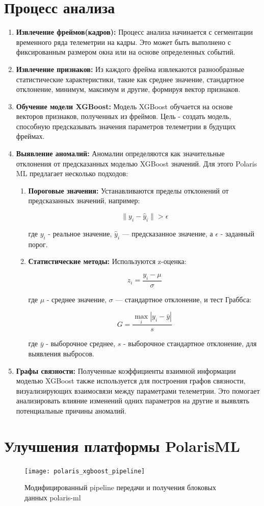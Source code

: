 \section{Процесс анализа}

\begin{enumerate}[label=\arabic*.]
	\item \textbf{Извлечение фреймов(кадров):} Процесс анализа начинается с сегментации
	      временного ряда телеметрии на кадры.
	      Это может быть выполнено с фиксированным размером окна или на основе
	      определенных событий.
	\item \textbf{Извлечение признаков:} Из каждого фрейма извлекаются
	      разнообразные статистические характеристики, такие как среднее значение,
	      стандартное отклонение, минимум, максимум и другие, формируя вектор
	      признаков.
	\item \textbf{Обучение модели XGBoost:} Модель XGBoost обучается на основе
	      векторов признаков, полученных из фреймов.
	      Цель - создать модель, способную предсказывать значения параметров
	      телеметрии в будущих фреймах.
	\item \textbf{Выявление аномалий:} Аномалии определяются как значительные
	      отклонения от предсказанных моделью XGBoost значений.
	      Для этого Polaris ML предлагает несколько подходов:
	      \begin{enumerate}[label=\alph*.]
		      \item \textbf{Пороговые значения:} Устанавливаются пределы отклонений от предсказанных значений, например:

		            \[\| y_i - \hat{y}_i \| > \epsilon\]

		            где $y_i$ - реальное значение, $\hat{y}_i$ — предсказанное значение, а $\epsilon$ - заданный порог.
		      \item \textbf{Статистические методы:} Используются z-оценка:

		            \[z_i = \frac{y_i - \mu}{\sigma}\]

		            где $\mu$ - среднее значение, $\sigma$ — стандартное отклонение, и тест Граббса:

		            \[G = \frac{\max_{i}|y_i - \bar{y}|}{s}\]

		            где $\bar{y}$ - выборочное среднее, $s$ - выборочное стандартное отклонение, для выявления выбросов.
	      \end{enumerate}
	\item \textbf{Графы связности:} Полученные коэффициенты взаимной информации моделью XGBoost также используется для
	      построения графов связности, визуализирующих взаимосвязи между параметрами
	      телеметрии.
	      Это помогает анализировать влияние изменений одних параметров на другие
	      и выявлять потенциальные причины аномалий.
\end{enumerate}


\section{Улучшения платформы PolarisML}

\begin{figure}[!htbp]
	\centering
	\texttt{[image: polaris\_xgboost\_pipeline]}
	~\caption{Модифицированный pipeline передачи и получения блоковых данных polaris-ml}
	\label{fig:polaris_xgboost_pipeline}
\end{figure}
